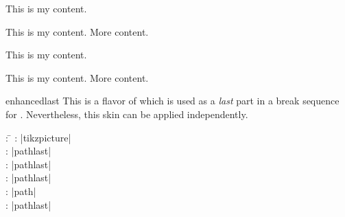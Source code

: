 \begin{dispExample}
\begin{tcbraster}[skin=enhancedmiddle,raster equal height,raster columns=4,
    colback=LightGreen,colframe=DarkGreen,colbacktitle=LimeGreen!75!DarkGreen,
    left=1mm,right=1mm,top=1mm,bottom=1mm,middle=1mm]
  \begin{tcolorbox}
    This is my content.
  \end{tcolorbox}
  \begin{tcolorbox}
    This is my content.
    \tcblower
    More content.
  \end{tcolorbox}
  \begin{tcolorbox}[adjusted title=My title]
    This is my content.
  \end{tcolorbox}
  \begin{tcolorbox}[adjusted title=My title]
    This is my content.
    \tcblower
    More content.
  \end{tcolorbox}
\end{tcbraster}
\end{dispExample}




\clearpage
\begin{docSkin}{enhancedlast}
This is a flavor of  which is used as a \emph{last} part
in a break sequence for .
Nevertheless, this skin can be applied independently.
\begin{tcolorbox}[skintable=enhancedlast]
  \begin{tabbing}
    : \=\kill
    :  \> |tikzpicture|\\ 
    :           \> |pathlast|\\
    : \> |pathlast|\\ 
    :        \> |pathlast|\\
    :    \> |path|\\
    :           \> |pathlast|
  \end{tabbing}
\end{tcolorbox}
\end{docSkin}

